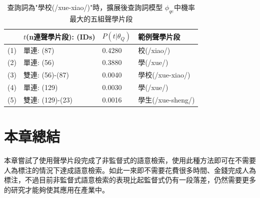 \begin{table}[htbp]
\centering
\begin{tabular}{llll}
\hline
& $t$(n連聲學片段): (IDs) & $P(t|\theta_Q)$ & 範例聲學片段 \\
\hline 
(1) & 單連: (87) & 0.4280 & 校(/xiao/) \\
(2) & 單連: (56) & 0.3880 & 學(/xue/) \\
(3) & 雙連: (56)-(87) & 0.0040 & 學校(/xue-xiao/) \\
(4) & 單連: (129) & 0.0030 & 學(/xue/) \\ 
(5) & 雙連: (129)-(23) & 0.0016 & 學生(/xue-sheng/) \\
\end{tabular}
\caption{查詢詞為"學校(/xue-xiao/)"時，擴展後查詢詞模型 $\phi_{qe}$中機率最大的五組聲學片段}
\label{table:chap4_spa}
\end{table}

\section{本章總結}
本章嘗試了使用聲學片段完成了非監督式的語意檢索，使用此種方法即可在不需要人為標注的情況下達成語意檢索。如此一來即不需要花費很多時間、金錢完成人為標注，不過目前非監督式語意檢索的表現比起監督式仍有一段落差，仍然需要更多的研究才能夠使其應用在產業中。
